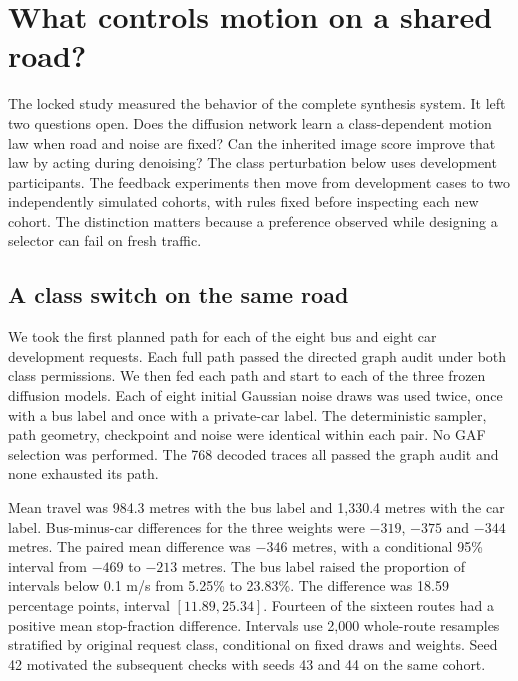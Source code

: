 \chapter{What controls motion on a shared road?}
\label{ch:g8}
The locked study measured the behavior of the complete synthesis system. It left two questions open. Does the diffusion network learn a class-dependent motion law when road and noise are fixed? Can the inherited image score improve that law by acting during denoising? The class perturbation below uses development participants. The feedback experiments then move from development cases to two independently simulated cohorts, with rules fixed before inspecting each new cohort. The distinction matters because a preference observed while designing a selector can fail on fresh traffic.

\section{A class switch on the same road}
We took the first planned path for each of the eight bus and eight car development requests. Each full path passed the directed graph audit under both class permissions. We then fed each path and start to each of the three frozen diffusion models. Each of eight initial Gaussian noise draws was used twice, once with a bus label and once with a private-car label. The deterministic sampler, path geometry, checkpoint and noise were identical within each pair. No GAF selection was performed. The 768 decoded traces all passed the graph audit and none exhausted its path.

Mean travel was 984.3 metres with the bus label and 1,330.4 metres with the car label. Bus-minus-car differences for the three weights were $-319$, $-375$ and $-344$ metres. The paired mean difference was $-346$ metres, with a conditional 95\% interval from $-469$ to $-213$ metres. The bus label raised the proportion of intervals below 0.1 m/s from 5.25\% to 23.83\%. The difference was 18.59 percentage points, interval $[11.89,25.34]$. Fourteen of the sixteen routes had a positive mean stop-fraction difference. Intervals use 2,000 whole-route resamples stratified by original request class, conditional on fixed draws and weights. Seed 42 motivated the subsequent checks with seeds 43 and 44 on the same cohort.

